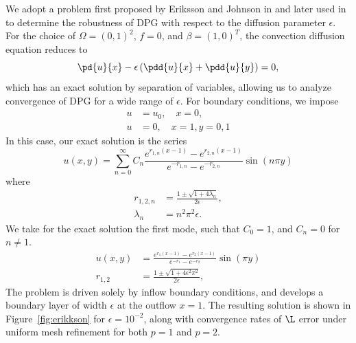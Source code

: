 We adopt a problem first proposed by Eriksson and Johnson in \cite{Eriksson1993} and later used in \cite{DPGrobustness, DPGrobustness2} to determine the robustness of DPG with respect to the diffusion parameter $\epsilon$. For the choice of $\Omega = (0,1)^2$, $f=0$, and $\beta = (1,0)^T$, the convection diffusion equation reduces to
\[
\pd{u}{x} - \epsilon \left(\pdd{u}{x}+ \pdd{u}{y}\right) = 0,
\]
which has an exact solution by separation of variables, allowing us to analyze convergence of DPG for a wide range of $\epsilon$. For boundary conditions, we impose
\begin{align*}
u &= u_0, \quad x=0,\\
u &= 0, \quad x=1, y = 0,1
\end{align*}
In this case, our exact solution is the series
\[
u(x,y) = \sum_{n=0}^\infty C_n \frac{e^{r_{1,n}(x-1)} - e^{r_{2,n}(x-1)}}{e^{-r_{1,n}} - e^{-r_{2,n}}} \sin (n\pi y)
\]
where
\begin{align*}
r_{1,2,n} &= \frac{1 \pm \sqrt{1 + 4 \lambda_n}}{2 \epsilon},\\
\lambda_n &= n^2\pi^2 \epsilon.
\end{align*}
We take for the exact solution the first mode, such that $C_0 = 1$, and $C_n = 0$ for $n\neq 1$.  
\begin{align*}
u(x,y) &= \frac{e^{r_{1}(x-1)} - e^{r_{2}(x-1)}}{e^{-r_{1}} - e^{-r_{2}}} \sin (\pi y)\\
r_{1,2} &= \frac{1 \pm \sqrt{1 + 4 \epsilon^2 \pi^2}}{2 \epsilon},
\end{align*}
The problem is driven solely by inflow boundary conditions, and develops a boundary layer of width $\epsilon$ at the outflow $x = 1$.  The resulting solution is shown in Figure~\ref{fig:erikkson} for $\epsilon = 10^{-2}$, along with convergence rates of $\L$ error under uniform mesh refinement for both $p=1$ and $p=2$.  
